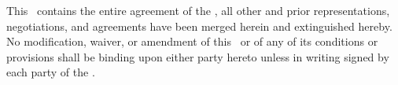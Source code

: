 This \amendmentTitle\ contains the entire agreement of the \parties, all other and prior representations, negotiations, and agreements have been merged herein and extinguished hereby. No modification, waiver, or amendment of this \amendmentTitle\ or of any of its conditions or provisions shall be binding upon either party hereto unless in writing signed by each party of the \parties.
